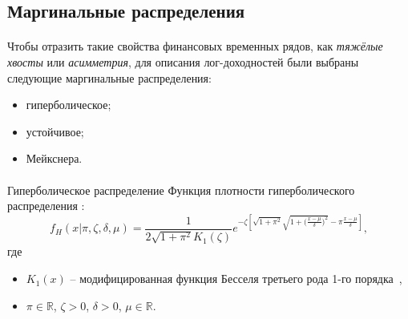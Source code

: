 \documentclass[aspectratio=169]{beamer}
\begin{document}
\subsection{Маргинальные распределения}

\begin{frame}{\insertsection}
    \framesubtitle{\insertsubsection}
    Чтобы отразить такие свойства финансовых временных рядов, как \textit{тяжёлые хвосты} или \textit{асимметрия}, для описания лог-доходностей были выбраны следующие маргинальные распределения:
    \begin{itemize}
        \item<2-> гиперболическое;
        \item<3-> устойчивое;
        \item<4-> Мейкснера.
    \end{itemize}
\end{frame}

\begin{frame}{\insertsection}
    \framesubtitle{\insertsubsection}
    \begin{block}{Гиперболическое распределение}
    Функция плотности гиперболического распределения \cite{Barndoff1983}:
    \begin{equation}
        f_H(x|\pi,\zeta,\delta,\mu) = \frac{1}{2 \sqrt{1+\pi^2} K_1(\zeta)} e^{-\zeta \left[ \sqrt{1+\pi^2} \sqrt{1 + \big( \frac{x - \mu}{\delta})^2} - \pi \frac{x - \mu}{\delta} \right]},
    \end{equation}
    где
    \begin{itemize}
        \item $K_1(x)$ -- модифицированная функция Бесселя третьего рода 1-го порядка~\cite{Bessel1824}, 
        \item $\pi \in \mathbb{R}$, $\zeta > 0$, $\delta > 0$, $\mu \in \mathbb{R}$.
    \end{itemize}
    \end{block}
\end{frame}
\end{document}
